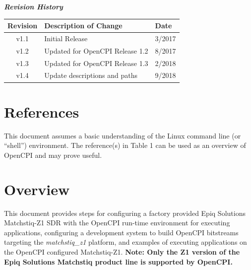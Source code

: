 	\begin{center}
	\textit{\textbf{Revision History}}
		\begin{table}[H]
		\label{table:revisions} %
			\begin{tabularx}{\textwidth}{|c|X|l|}
			\hline
			\rowcolor{blue}
			\textbf{Revision} & \textbf{Description of Change} & \textbf{Date} \\
		    \hline
            v1.1 & Initial Release & 3/2017 \\
            \hline
            v1.2 & Updated for OpenCPI Release 1.2 & 8/2017 \\
            \hline
            v1.3 & Updated for OpenCPI Release 1.3 & 2/2018 \\
            \hline
            v1.4 & Update descriptions and paths & 9/2018 \\
            \hline
			\end{tabularx}
		\end{table}
	\end{center}

\newpage

\tableofcontents

\newpage

\section{References}

	This document assumes a basic understanding of the Linux command line (or ``shell'') environment.  The reference(s) in Table 1 can be used as an overview of OpenCPI and may prove useful.
\def\refskipocpiov{}
\def\refcapbottom{}


\newpage
\section{Overview}
This document provides steps for configuring a factory provided Epiq Solutions Matchstiq-Z1 SDR with the OpenCPI run-time environment for executing applications, configuring a development system to build OpenCPI bitstreams targeting the \textit{matchstiq\_z1} platform, and examples of executing applications on the OpenCPI configured Matchstiq-Z1. \textbf{Note: Only the Z1 version of the Epiq Solutions Matchstiq product line is supported by OpenCPI.}

